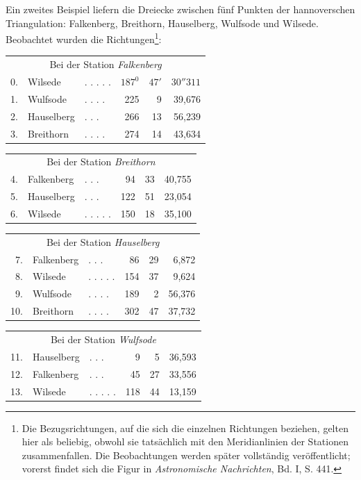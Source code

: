 Ein zweites Beispiel liefern die Dreiecke zwischen fünf Punkten der hannoverschen Triangulation: Falkenberg, Breithorn, Hauselberg, Wulfsode und Wilsede. Beobachtet wurden die Richtungen\footnote{Die Bezugsrichtungen, auf die sich die einzelnen Richtungen beziehen, gelten hier als beliebig, obwohl sie tatsächlich mit den Meridianlinien der Stationen zusammenfallen. Die Beobachtungen werden später vollständig veröffentlicht; vorerst findet sich die Figur in \textit{Astronomische Nachrichten}, Bd. I, S. 441.}:
\begin{center}
\begin{tabular}{r l l r r r}
\multicolumn{6}{c}{Bei der Station \textit{Falkenberg}}\\[5pt]
0.&Wilsede&. . . . .&\(187^0\)&\(47'\)&\(30''311\)\\
1.&Wulfsode&. . . .&225&9&39,676\\
2.&Hauselberg&. . .&266&13&56,239\\
3.&Breithorn&. . . .&274&14&43,634
\end{tabular}
\end{center}
\begin{center}
\begin{tabular}{r l l r r r}
\multicolumn{6}{c}{Bei der Station \textit{Breithorn}}\\[5pt]
4.&Falkenberg&. . .&94&33&40,755\\
5.&Hauselberg&. . .&122&51&23,054\\
6.&Wilsede&. . . . .&150&18&35,100
\end{tabular}
\end{center}
\begin{center}
\begin{tabular}{r l l r r r}
\multicolumn{6}{c}{Bei der Station \textit{Hauselberg}}\\[5pt]
7.&Falkenberg&. . .&86&29&6,872\\
8.&Wilsede&. . . . .&154&37&9,624\\
9.&Wulfsode&. . . .&189&2&56,376\\
10.&Breithorn&. . . .&302&47&37,732
\end{tabular}
\end{center}
\begin{center}
\begin{tabular}{r l l r r r}
\multicolumn{6}{c}{Bei der Station \textit{Wulfsode}}\\[5pt]
11.&Hauselberg&. . .&9&5&36,593\\
12.&Falkenberg&. . .&45&27&33,556\\
13.&Wilsede&. . . . .&118&44&13,159
\end{tabular}
\end{center}
